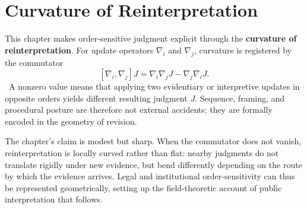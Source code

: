 
\chapter{Curvature of Reinterpretation}
\label{ch:ch079}

This chapter makes order-sensitive judgment explicit through the \textbf{curvature of reinterpretation}. For update operators \(\nabla_i\) and \(\nabla_j\), curvature is registered by the commutator
\[
[\nabla_i,\nabla_j]J
=
\nabla_i\nabla_j J-\nabla_j\nabla_i J.
\]
\Definition\ A nonzero value means that applying two evidentiary or interpretive updates in opposite orders yields different resulting judgment \(J\). Sequence, framing, and procedural posture are therefore not external accidents; they are formally encoded in the geometry of revision.

The chapter's claim is modest but sharp. When the commutator does not vanish, reinterpretation is locally curved rather than flat: nearby judgments do not translate rigidly under new evidence, but bend differently depending on the route by which the evidence arrives. Legal and institutional order-sensitivity can thus be represented geometrically, setting up the field-theoretic account of public interpretation that follows.

